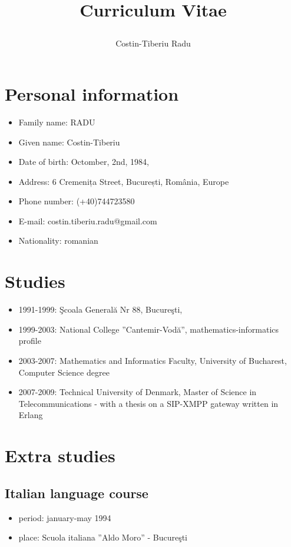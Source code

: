 \documentclass[a4paper,12pt,openany]{article}
\title{\begin{huge}Curriculum Vitae\end{huge}}
\author{\begin{large}Costin-Tiberiu Radu\end{large}}
\begin{document}
\maketitle
\section{Personal information}
	\begin{itemize}
 		\item Family name:	RADU
		\item Given name:	Costin-Tiberiu
		\item Date of birth:	Octomber, 2nd, 1984,
		\item Address:		6 Cremenița Street, București, România, Europe
		\item Phone number:	(+40)744723580
		\item E-mail:		costin.tiberiu.radu@gmail.com
		\item Nationality:	romanian
	\end{itemize}

\section{Studies}
	\begin{itemize}
	 	\item 1991-1999: Şcoala Generală Nr 88, Bucureşti,
		\item 1999-2003: National College ”Cantemir-Vodă”, mathematics-informatics profile
		\item 2003-2007: Mathematics and Informatics Faculty, University of Bucharest, Computer Science degree
		\item 2007-2009: Technical University of Denmark, Master of Science in Telecommunications - with a thesis on a SIP-XMPP gateway written in Erlang
	\end{itemize}

\section{Extra studies}
	\subsection{Italian language course}
		\begin{itemize}
		 	\item period: january-may 1994
			\item place: Scuola italiana ”Aldo Moro” - Bucureşti
		\end{itemize}
\end{document}
